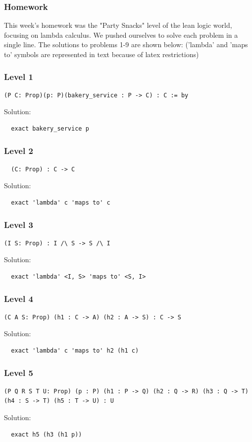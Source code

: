 \documentclass{article}
\theoremstyle{theorem}
\theoremstyle{definition}
\theoremstyle{remark}
\begin{document}
\subsubsection*{Homework}
This week's homework was the "Party Snacks" level of the lean logic world, focusing on lambda calculus. 
We pushed ourselves to solve each problem in a single line. The solutions to problems 1-9 are shown below:
('lambda' and 'maps to' symbols are represented in text because of latex restrictions)
\subsubsection*{Level 1}
\begin{lstlisting}
(P C: Prop)(p: P)(bakery_service : P -> C) : C := by
\end{lstlisting}
Solution:
\begin{lstlisting}
  exact bakery_service p
\end{lstlisting}
\subsubsection*{Level 2}
\begin{lstlisting}
  (C: Prop) : C -> C
\end{lstlisting}
Solution:
\begin{lstlisting}
  exact 'lambda' c 'maps to' c
\end{lstlisting}
\subsubsection*{Level 3}
\begin{lstlisting}
(I S: Prop) : I /\ S -> S /\ I
\end{lstlisting}
Solution:
\begin{lstlisting}
  exact 'lambda' <I, S> 'maps to' <S, I>
\end{lstlisting}
\subsubsection*{Level 4}
\begin{lstlisting}
(C A S: Prop) (h1 : C -> A) (h2 : A -> S) : C -> S
\end{lstlisting}
Solution:
\begin{lstlisting}
  exact 'lambda' c 'maps to' h2 (h1 c)
\end{lstlisting}
\subsubsection*{Level 5}
\begin{lstlisting}
(P Q R S T U: Prop) (p : P) (h1 : P -> Q) (h2 : Q -> R) (h3 : Q -> T) (h4 : S -> T) (h5 : T -> U) : U
\end{lstlisting}
Solution:
\begin{lstlisting}
  exact h5 (h3 (h1 p))
\end{lstlisting}
\end{document}
